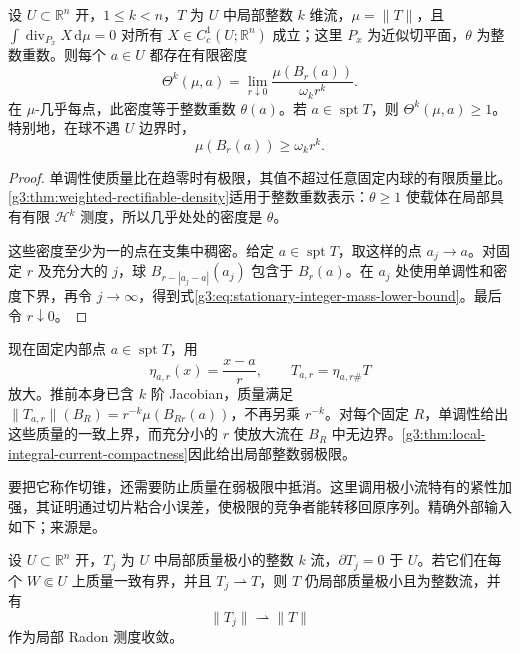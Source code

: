 \begin{corollary}\label{g3:cor:minimizing-current-density}
	设 \(U\subset\mathbb R^n\) 开，\(1\le k<n\)，\(T\) 为 \(U\) 中局部整数 \(k\) 维流，\(\mu=\|T\|\)，且 \(\int\operatorname{div}_{P_x}X\,\mathrm d\mu=0\) 对所有 \(X\in C_c^1(U;\mathbb R^n)\) 成立；这里 \(P_x\) 为近似切平面，\(\theta\) 为整数重数。则每个 \(a\in U\) 都存在有限密度
	\[
		\Theta^k(\mu,a)
		=\lim_{r\downarrow0}\frac{\mu(B_r(a))}{\omega_kr^k}.
	\]
	在 \(\mu\)-几乎每点，此密度等于整数重数 \(\theta(a)\)。若 \(a\in\operatorname{spt}T\)，则 \(\Theta^k(\mu,a)\ge1\)。特别地，在球不遇 \(U\) 边界时，
	\begin{equation}\label{g3:eq:stationary-integer-mass-lower-bound}
		\mu(B_r(a))\ge\omega_kr^k.
	\end{equation}
\end{corollary}
\begin{proof}
	单调性使质量比在趋零时有极限，其值不超过任意固定内球的有限质量比。\cref{g3:thm:weighted-rectifiable-density}适用于整数重数表示：\(\theta\ge1\) 使载体在局部具有有限 \(\mathcal H^k\) 测度，所以几乎处处的密度是 \(\theta\)。

	这些密度至少为一的点在支集中稠密。给定 \(a\in\operatorname{spt}T\)，取这样的点 \(a_j\to a\)。对固定 \(r\) 及充分大的 \(j\)，球
	\(B_{r-|a_j-a|}(a_j)\) 包含于 \(B_r(a)\)。在 \(a_j\) 处使用单调性和密度下界，再令 \(j\to\infty\)，得到式\eqref{g3:eq:stationary-integer-mass-lower-bound}。最后令 \(r\downarrow0\)。
\end{proof}

现在固定内部点 \(a\in\operatorname{spt}T\)，用
\[
	\eta_{a,r}(x)=\frac{x-a}{r},\qquad T_{a,r}=\eta_{a,r\#}T
\]
放大。推前本身已含 \(k\) 阶 Jacobian，质量满足
\(\|T_{a,r}\|(B_R)=r^{-k}\mu(B_{Rr}(a))\)，不再另乘 \(r^{-k}\)。对每个固定 \(R\)，单调性给出这些质量的一致上界，而充分小的 \(r\) 使放大流在 \(B_R\) 中无边界。\cref{g3:thm:local-integral-current-compactness}因此给出局部整数弱极限。

\ProseParagraphBreak
要把它称作切锥，还需要防止质量在弱极限中抵消。这里调用极小流特有的紧性加强，其证明通过切片粘合小误差，使极限的竞争者能转移回原序列。精确外部输入如下；来源是\cite[定理34.5及注34.6(1)，第198--202页]{Simon1983}。

\begin{theorem}\label{g3:thm:minimizing-current-mass-compactness}
	设 \(U\subset\mathbb R^n\) 开，\(T_j\) 为 \(U\) 中局部质量极小的整数 \(k\) 流，\(\partial T_j=0\) 于 \(U\)。若它们在每个 \(W\Subset U\) 上质量一致有界，并且 \(T_j\rightharpoonup T\)，则 \(T\) 仍局部质量极小且为整数流，并有
	\[
		\|T_j\|\rightharpoonup\|T\|
	\]
	作为局部 Radon 测度收敛。
\end{theorem}

